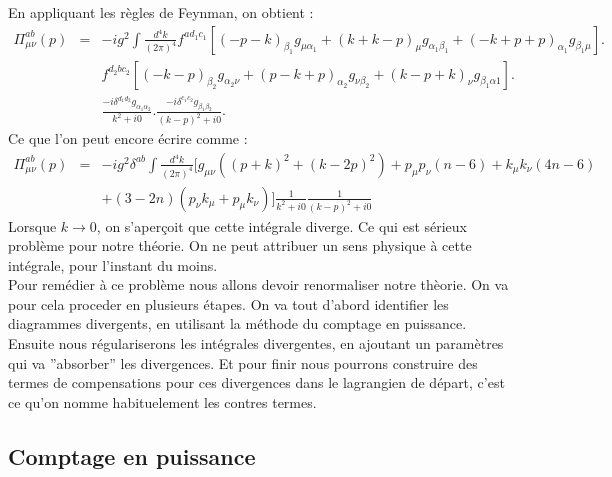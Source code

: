 \documentclass[a4paper,11pt]{article}
\theoremstyle{plain}
\theoremstyle{definition}
\theoremstyle{remark}
\numberwithin{equation}{section}
\numberwithin{equation}{subsection}
\numberwithin{figure}{section}
\begin{document}
\noindent
En appliquant les règles de Feynman, on obtient :
\begin{eqnarray}
 \Pi^{ab}_{\mu\nu}(p) &=& - i g^{2}  \int \frac{d^{4}k}{\left(2\pi\right)^4} f^{ad_{1}c_{1}} 
\left[(-p-k)_{\beta_{1}}g_{\mu\alpha_{1}}  +  (k+k-p)_{\mu}g_{\alpha_{1}\beta_{1}}  +  (-k+p+p)_{\alpha_{1}}g_{\beta_{1}\mu}  \right]. \nonumber \\
&& f^{d_{2}bc_{2}} \left[(-k-p)_{\beta_{2}}g_{\alpha_{2}\nu}  +  (p-k+p)_{\alpha_{2}}g_{\nu\beta_{2}}  
+  (k-p+k)_{\nu}g_{\beta_{1}\alpha{1}}  \right].\nonumber  \\
&& \frac{-i\delta^{d_{1}d_{2}}g_{\alpha_{1}\alpha_{2}}}{k^2+i0} . \frac{-i\delta^{c_{1}c_{2}}g_{\beta_{1}\beta_{2}}}{(k-p)^2+i0}  .
\end{eqnarray}
Ce que l'on peut encore écrire comme :
\begin{eqnarray}
 \Pi^{ab}_{\mu\nu}(p) &=&  - i g^{2}  \delta^{ab} \int \frac{d^{4}k}{\left(2\pi\right)^4} 
[g_{\mu\nu}\left((p+k)^{2} +(k-2p)^2\right) + p_{\mu}p_{\nu}\left(n-6\right)+k_{\mu}k_{\nu}\left(4n-6\right)  \nonumber  \\
&&  +(3-2n)(p_{\nu}k_{\mu}+p_{\mu}k_{\nu})]\frac{1}{k^2+i0}\frac{1}{(k-p)^2+i0}
\end{eqnarray}
Lorsque $k \to 0$, on s'aperçoit que cette intégrale diverge. Ce qui est sérieux problème pour notre théorie. On ne peut attribuer un sens 
physique à cette intégrale, pour l'instant du moins.\\

\noindent
Pour remédier à ce problème nous allons devoir renormaliser notre thèorie. On va pour cela proceder en plusieurs étapes. On va tout d'abord 
identifier les diagrammes divergents, en utilisant la méthode du comptage en puissance. Ensuite nous régulariserons les intégrales divergentes, 
en ajoutant un paramètres qui va ''absorber'' les divergences. Et pour finir nous pourrons construire des termes de compensations pour ces 
divergences dans le lagrangien de départ, c'est ce qu'on nomme habituelement les contres termes.

\subsection{Comptage en puissance}
\end{document}
